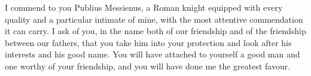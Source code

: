 

I commend to you Publius Messienus, a Roman knight equipped with every quality and a particular intimate of mine, with the most attentive commendation it can carry. I ask of you, in the name both of our friendship and of the friendship between our fathers, that you take him into your protection and look after his interests and his good name. You will have attached to yourself a good man and one worthy of your friendship, and you will have done me the greatest favour.
